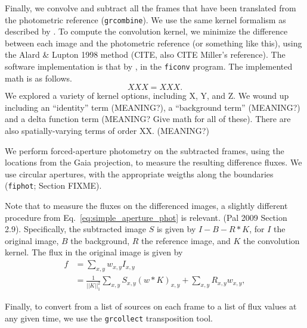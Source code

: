 \documentclass[12pt,twocolumn,tighten]{aastex62}
\begin{document}

Finally, we convolve and subtract all the frames that have been
translated from the photometric reference (\texttt{grcombine}).
We use the same kernel formalism as described by
\citet{soares-furtado_image_2017}.
To compute the convolution kernel, we minimize the difference between
each image and the photometric reference (or something like this),
using the Alard \& Lupton 1998 method (CITE, also CITE Miller's
reference).
The software implementation is that by \citet{Pal_2009}, in the
\texttt{ficonv} program.
The implemented math is as follows.
\begin{equation}
  XXX = XXX. %
\end{equation}
We explored a variety of kernel options, including X, Y, and Z.
We wound up including an ``identity'' term (MEANING?), a ``background
term'' (MEANING?) and a delta function term (MEANING? Give math for
all of these).
There are also spatially-varying terms of order XX. (MEANING?)

We perform forced-aperture photometry on the subtracted frames,
using the locations from the Gaia projection, to measure the resulting
difference fluxes.
We use circular apertures, with the appropriate weigths along the
boundaries (\texttt{fiphot}; \citet{Pal_2009} Section FIXME).

Note that to measure the fluxes on the differenced images, a
slightly different procedure from Eq.~\ref{eq:simple_aperture_phot} is
relevant.
(Pal 2009 Section 2.9).
Specifically, the subtracted image $S$ is given by $I - B - R\ast K$,
for $I$ the original image, $B$ the background, $R$ the reference
image, and $K$ the convolution kernel.
The flux in the original image is given by
\begin{align}
  f &= \sum_{x,y} w_{x,y} I_{x,y} \\
    &= 
       \frac{1}{|| K ||_1^2} \sum_{x,y} S_{x,y} (w \ast K)_{x,y}
       +
       \sum_{x,y} R_{x,y} w_{x,y},
\end{align}

Finally, to convert from a list of sources on each frame to a list of
flux values at any given time, we use the \texttt{grcollect}
transposition tool.
\end{document}
